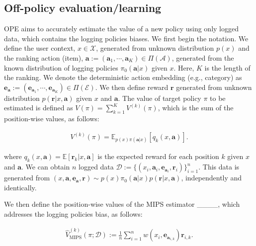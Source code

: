 \subsection{Off-policy evaluation/learning}
OPE aims to accurately estimate the value of a new policy using only logged data, which contains the logging policies biases. We first begin the notation. We define the user context, \( x \in \mathcal{X} \), generated from unknown distribution \( p(x) \) and the ranking action (item), \( \boldsymbol{a} := (\boldsymbol{a}_1,\cdots,\boldsymbol{a}_K) \in \Pi(\mathcal{A}) \), generated from the known distribution of logging policies \( \pi_{0}(\boldsymbol{a}|x) \) given \( x \). Here, \( K \) is the length of the ranking. We denote the deterministic action embedding (e.g., category) as \( \boldsymbol{e}_{\boldsymbol{a}} := (\boldsymbol{e}_{\boldsymbol{a}_1},\cdots,\boldsymbol{e}_{\boldsymbol{a}_K}) \in \Pi(\mathcal{E}) \).
We then define reward \( \boldsymbol{r} \) generated from unknown distribution \( p(\boldsymbol{r}|x,\boldsymbol{a}) \) given \( x \) and \( \boldsymbol{a} \). The value of target policy \( \pi \) to be estimated is defined as \( V(\pi) = \sum_{k=1}^{K} V^{(k)}(\pi) \), which is the sum of the position-wise values, as follows:

\vspace{-5mm}
\begin{align}
    V^{(k)}(\pi) = \mathbb{E}_{p(x)\pi(\boldsymbol{a}|x)}[q_{k}(x, \boldsymbol{a})].
\end{align}
\vspace{-5mm}

where \( q_{k}(x, \boldsymbol{a}) = \mathbb{E}[\boldsymbol{r}_k|x,\boldsymbol{a}] \) is the expected reward for each position \( k \) given \( x \) and \( \boldsymbol{a} \). We can obtain \( n \) logged data \( \mathcal{D} := \{ (x_i, \boldsymbol{a}_i, \boldsymbol{e}_{\boldsymbol{a}_i}, \boldsymbol{r}_i) \}_{i=1}^{n} \). This data is generated from \( (x,\boldsymbol{a}, \boldsymbol{e}_{\boldsymbol{a}}, \boldsymbol{r}) \sim p(x)\pi_{0}(\boldsymbol{a}|x)p(\boldsymbol{r}|x,\boldsymbol{a}) \), independently and identically.

We then define the position-wise values of the MIPS estimator ____, which addresses the logging policies bias, as follows:

\vspace{-6mm}
\begin{align}
    \hat{V}^{(k)}_{\text{MIPS}}(\pi;\mathcal{D}) := \frac{1}{n}\sum_{i=1}^{n} w(x_i, \boldsymbol{e}_{\boldsymbol{a}_{i,k}}) \boldsymbol{r}_{i,k}.
\end{align}
\vspace{-4mm}

